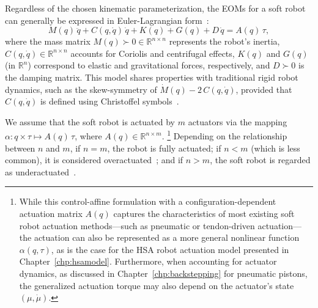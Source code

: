 Regardless of the chosen kinematic parameterization, the \glspl{EOM} for a soft robot can generally be expressed in Euler-Lagrangian form~\citep{della2023model}:
\begin{equation}\label{eq:background:dynamics:eom}
M(q) \, \ddot{q} + C(q, \dot{q}) \, \dot{q} + K(q) + G(q) + D \, \dot{q} = A(q) \, \tau,
\end{equation}
where the mass matrix $M(q) \succ 0 \in \mathbb{R}^{n \times n}$ represents the robot’s inertia, $C(q,\dot{q}) \in \mathbb{R}^{n \times n}$ accounts for Coriolis and centrifugal effects, $K(q)$ and $G(q)$ (in $\mathbb{R}^{n}$) correspond to elastic and gravitational forces, respectively, and $D \succ 0$ is the damping matrix. This model shares properties with traditional rigid robot dynamics, such as the skew-symmetry of $\dot{M}(q) - 2 \, C(q,\dot{q})$, provided that $C(q,\dot{q})$ is defined using Christoffel symbols~\citep{della2020model}.

We assume that the soft robot is actuated by $m$ actuators via the mapping $\alpha: q \times \tau \mapsto A(q) \, \tau$, where $A(q) \in \mathbb{R}^{n \times m}$.
\footnote{While this control-affine formulation with a configuration-dependent actuation matrix $A(q)$ captures the characteristics of most existing soft robot actuation methods—such as pneumatic or tendon-driven actuation—the actuation can also be represented as a more general nonlinear function $\alpha(q,\tau)$, as is the case for the \gls{HSA} robot actuation model presented in Chapter~\ref{chp:hsamodel}. Furthermore, when accounting for actuator dynamics, as discussed in Chapter~\ref{chp:backstepping} for pneumatic pistons, the generalized actuation torque may also depend on the actuator’s state $(\mu,\dot{\mu})$.}
Depending on the relationship between $n$ and $m$, if $n=m$, the robot is fully actuated; if $n < m$ (which is less common), it is considered overactuated~\citep{pustina2024input}; and if $n > m$, the soft robot is regarded as underactuated~\citep{pustina2025analysis}.

